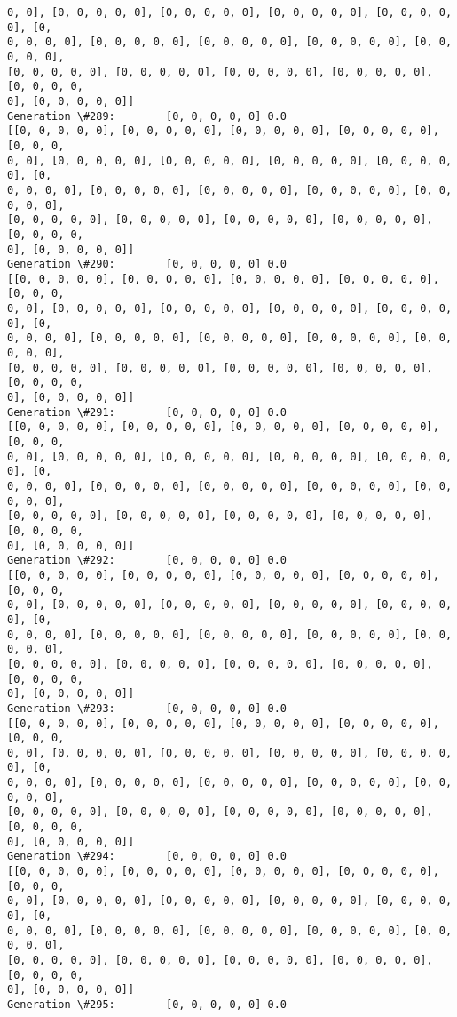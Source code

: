 \documentclass[11pt]{article}
\begin{document}
\begin{Verbatim}[commandchars=\\\{\}]
0, 0], [0, 0, 0, 0, 0], [0, 0, 0, 0, 0], [0, 0, 0, 0, 0], [0, 0, 0, 0, 0], [0,
0, 0, 0, 0], [0, 0, 0, 0, 0], [0, 0, 0, 0, 0], [0, 0, 0, 0, 0], [0, 0, 0, 0, 0],
[0, 0, 0, 0, 0], [0, 0, 0, 0, 0], [0, 0, 0, 0, 0], [0, 0, 0, 0, 0], [0, 0, 0, 0,
0], [0, 0, 0, 0, 0]]
Generation \#289:        [0, 0, 0, 0, 0] 0.0
[[0, 0, 0, 0, 0], [0, 0, 0, 0, 0], [0, 0, 0, 0, 0], [0, 0, 0, 0, 0], [0, 0, 0,
0, 0], [0, 0, 0, 0, 0], [0, 0, 0, 0, 0], [0, 0, 0, 0, 0], [0, 0, 0, 0, 0], [0,
0, 0, 0, 0], [0, 0, 0, 0, 0], [0, 0, 0, 0, 0], [0, 0, 0, 0, 0], [0, 0, 0, 0, 0],
[0, 0, 0, 0, 0], [0, 0, 0, 0, 0], [0, 0, 0, 0, 0], [0, 0, 0, 0, 0], [0, 0, 0, 0,
0], [0, 0, 0, 0, 0]]
Generation \#290:        [0, 0, 0, 0, 0] 0.0
[[0, 0, 0, 0, 0], [0, 0, 0, 0, 0], [0, 0, 0, 0, 0], [0, 0, 0, 0, 0], [0, 0, 0,
0, 0], [0, 0, 0, 0, 0], [0, 0, 0, 0, 0], [0, 0, 0, 0, 0], [0, 0, 0, 0, 0], [0,
0, 0, 0, 0], [0, 0, 0, 0, 0], [0, 0, 0, 0, 0], [0, 0, 0, 0, 0], [0, 0, 0, 0, 0],
[0, 0, 0, 0, 0], [0, 0, 0, 0, 0], [0, 0, 0, 0, 0], [0, 0, 0, 0, 0], [0, 0, 0, 0,
0], [0, 0, 0, 0, 0]]
Generation \#291:        [0, 0, 0, 0, 0] 0.0
[[0, 0, 0, 0, 0], [0, 0, 0, 0, 0], [0, 0, 0, 0, 0], [0, 0, 0, 0, 0], [0, 0, 0,
0, 0], [0, 0, 0, 0, 0], [0, 0, 0, 0, 0], [0, 0, 0, 0, 0], [0, 0, 0, 0, 0], [0,
0, 0, 0, 0], [0, 0, 0, 0, 0], [0, 0, 0, 0, 0], [0, 0, 0, 0, 0], [0, 0, 0, 0, 0],
[0, 0, 0, 0, 0], [0, 0, 0, 0, 0], [0, 0, 0, 0, 0], [0, 0, 0, 0, 0], [0, 0, 0, 0,
0], [0, 0, 0, 0, 0]]
Generation \#292:        [0, 0, 0, 0, 0] 0.0
[[0, 0, 0, 0, 0], [0, 0, 0, 0, 0], [0, 0, 0, 0, 0], [0, 0, 0, 0, 0], [0, 0, 0,
0, 0], [0, 0, 0, 0, 0], [0, 0, 0, 0, 0], [0, 0, 0, 0, 0], [0, 0, 0, 0, 0], [0,
0, 0, 0, 0], [0, 0, 0, 0, 0], [0, 0, 0, 0, 0], [0, 0, 0, 0, 0], [0, 0, 0, 0, 0],
[0, 0, 0, 0, 0], [0, 0, 0, 0, 0], [0, 0, 0, 0, 0], [0, 0, 0, 0, 0], [0, 0, 0, 0,
0], [0, 0, 0, 0, 0]]
Generation \#293:        [0, 0, 0, 0, 0] 0.0
[[0, 0, 0, 0, 0], [0, 0, 0, 0, 0], [0, 0, 0, 0, 0], [0, 0, 0, 0, 0], [0, 0, 0,
0, 0], [0, 0, 0, 0, 0], [0, 0, 0, 0, 0], [0, 0, 0, 0, 0], [0, 0, 0, 0, 0], [0,
0, 0, 0, 0], [0, 0, 0, 0, 0], [0, 0, 0, 0, 0], [0, 0, 0, 0, 0], [0, 0, 0, 0, 0],
[0, 0, 0, 0, 0], [0, 0, 0, 0, 0], [0, 0, 0, 0, 0], [0, 0, 0, 0, 0], [0, 0, 0, 0,
0], [0, 0, 0, 0, 0]]
Generation \#294:        [0, 0, 0, 0, 0] 0.0
[[0, 0, 0, 0, 0], [0, 0, 0, 0, 0], [0, 0, 0, 0, 0], [0, 0, 0, 0, 0], [0, 0, 0,
0, 0], [0, 0, 0, 0, 0], [0, 0, 0, 0, 0], [0, 0, 0, 0, 0], [0, 0, 0, 0, 0], [0,
0, 0, 0, 0], [0, 0, 0, 0, 0], [0, 0, 0, 0, 0], [0, 0, 0, 0, 0], [0, 0, 0, 0, 0],
[0, 0, 0, 0, 0], [0, 0, 0, 0, 0], [0, 0, 0, 0, 0], [0, 0, 0, 0, 0], [0, 0, 0, 0,
0], [0, 0, 0, 0, 0]]
Generation \#295:        [0, 0, 0, 0, 0] 0.0

\end{Verbatim}
\end{document}

